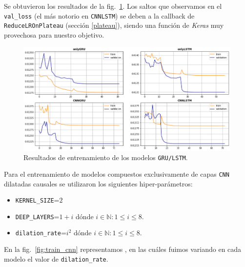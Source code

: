 \documentclass[a4paper,12pt]{article}
\begin{document}
Se obtuvieron los resultados de la fig.~\ref{fig:training_plot}. Los saltos que observamos en el \texttt{val\_loss} (el más notorio en \texttt{CNNLSTM}) se deben a la callback de \texttt{ReduceLROnPlateau} (sección \ref{plateau}), siendo una función de \textit{Keras} muy provechosa para nuestro objetivo.

\begin{figure}[H]
	\begin{center}
	\includegraphics[width=1\textwidth]{training_plots.png}
  	\caption{Resultados de entrenamiento de los modelos \texttt{GRU/LSTM}.}
  	\label{fig:training_plot}
  	\end{center}
\end{figure}

Para el entrenamiento de modelos compuestos exclusivamente de capas \texttt{CNN} dilatadas causales se utilizaron los siguientes hiper-parámetros:
\begin{itemize}[noitemsep, topsep=2pt]
	\item \texttt{KERNEL\_SIZE}=$2$
	\item \texttt{DEEP\_LAYERS}=$1+i$ dónde $i \in \mathbb{N}: 1 \leq i \leq 8$.
	\item \texttt{dilation\_rate}=$i^2$ dónde $i \in \mathbb{N}: 1 \leq i \leq 8$.
\end{itemize}

En la fig.~\ref{fig:train_cnn} representamos , en las cuáles fuimos variando en cada modelo el valor de \texttt{dilation\_rate}.
\end{document}
